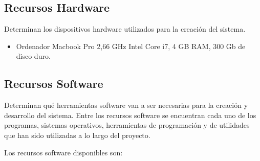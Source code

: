 \subsection{Recursos Hardware}

Determinan los dispositivos hardware utilizados para la creación del sistema.

\begin{itemize}
	\item Ordenador Macbook Pro 2,66 GHz Intel Core i7, 4 GB RAM, 300 Gb de disco duro.
\end{itemize}

\subsection{Recursos Software}

Determinan qué herramientas software van a ser necesarias para la creación y desarrollo del sistema. Entre los recursos software se encuentran cada uno de los programas, sistemas operativos, herramientas de programación y de utilidades que han sido utilizadas a lo largo del proyecto.

Los recursos software disponibles son:


